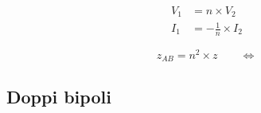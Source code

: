 \documentclass[10pt]{article}
\begin{document}
        \begin{minipage}[t]{.1\textwidth}
            \vspace{-\baselineskip}

            

        \end{minipage}
        \hfill
        \begin{minipage}[t]{.1\textwidth}
            \vspace{-\baselineskip}
            \vspace{.4cm}

            \begin{align*}
                V_1 &= n \times V_2\\
                I_1 &= -\frac{1}{n} \times I_2
            \end{align*}

        \end{minipage}
        \hfill
        \begin{minipage}[t]{.1\textwidth}
            \vspace{-\baselineskip}

            

        \end{minipage}
        \hfill
        \begin{minipage}[t]{.1\textwidth}
            \vspace{.3cm}

            \[
                z_{AB} = n^2 \times z \qquad \iff
            \]

        \end{minipage}
        \hfill
        \begin{minipage}[t]{.1\textwidth}
            \vspace{-\baselineskip}
            \vspace{.7cm}

            

        \end{minipage}

    \vspace{-1.5\baselineskip}
    \subsection*{Doppi bipoli}
\end{document}
